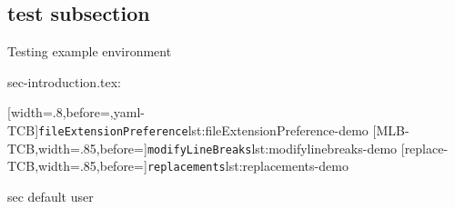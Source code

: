 
\subsection{test subsection}
\begin{example}
  Testing example environment
\end{example}

sec-introduction.tex:

[width=.8\linewidth,before=\centering,yaml-TCB]{\texttt{fileExtensionPreference}}{lst:fileExtensionPreference-demo}
[MLB-TCB,width=.85\linewidth,before=\centering]{\texttt{modifyLineBreaks}}{lst:modifylinebreaks-demo}
[replace-TCB,width=.85\linewidth,before=\centering]{\texttt{replacements}}{lst:replacements-demo}

sec default user

